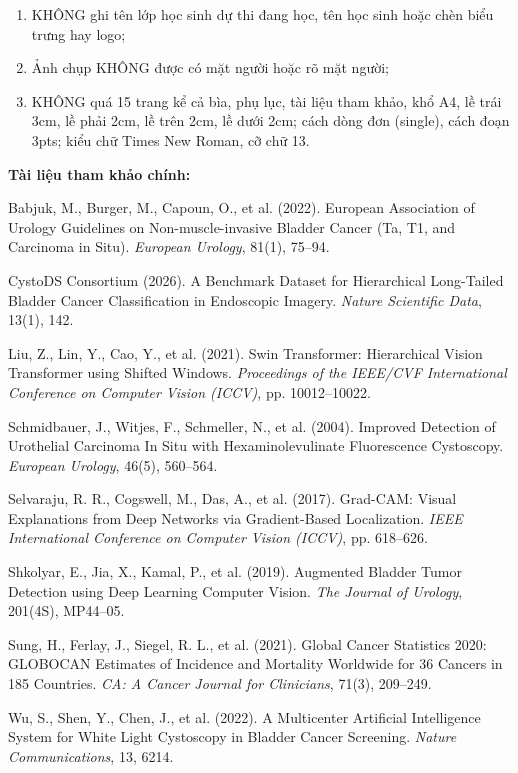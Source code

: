 \documentclass[a4paper]{article}
\begin{document}
\vspace{4pt}

\begin{enumerate}[leftmargin=1.25cm]
  \item KHÔNG ghi tên lớp học sinh dự thi đang học, tên học sinh hoặc chèn biểu trưng hay logo;
  \item Ảnh chụp KHÔNG được có mặt người hoặc rõ mặt người;
  \item KHÔNG quá 15 trang kể cả bìa, phụ lục, tài liệu tham khảo, khổ A4, lề trái 3cm, lề phải 2cm, lề trên 2cm, lề dưới 2cm; cách dòng đơn (single), cách đoạn 3pts; kiểu chữ Times New Roman, cỡ chữ 13.
\end{enumerate}

\vspace{8pt}
\noindent\textbf{Tài liệu tham khảo chính:}
\begin{enumerate}[leftmargin=1.25cm,label={[\arabic*]}]
  \item Babjuk, M., Burger, M., Capoun, O., et al. (2022). European Association of Urology Guidelines on Non-muscle-invasive Bladder Cancer (Ta, T1, and Carcinoma in Situ). \textit{European Urology}, 81(1), 75--94.
  \item CystoDS Consortium (2026). A Benchmark Dataset for Hierarchical Long-Tailed Bladder Cancer Classification in Endoscopic Imagery. \textit{Nature Scientific Data}, 13(1), 142.
  \item Liu, Z., Lin, Y., Cao, Y., et al. (2021). Swin Transformer: Hierarchical Vision Transformer using Shifted Windows. \textit{Proceedings of the IEEE/CVF International Conference on Computer Vision (ICCV)}, pp. 10012--10022.
  \item Schmidbauer, J., Witjes, F., Schmeller, N., et al. (2004). Improved Detection of Urothelial Carcinoma In Situ with Hexaminolevulinate Fluorescence Cystoscopy. \textit{European Urology}, 46(5), 560--564.
  \item Selvaraju, R. R., Cogswell, M., Das, A., et al. (2017). Grad-CAM: Visual Explanations from Deep Networks via Gradient-Based Localization. \textit{IEEE International Conference on Computer Vision (ICCV)}, pp. 618--626.
  \item Shkolyar, E., Jia, X., Kamal, P., et al. (2019). Augmented Bladder Tumor Detection using Deep Learning Computer Vision. \textit{The Journal of Urology}, 201(4S), MP44--05.
  \item Sung, H., Ferlay, J., Siegel, R. L., et al. (2021). Global Cancer Statistics 2020: GLOBOCAN Estimates of Incidence and Mortality Worldwide for 36 Cancers in 185 Countries. \textit{CA: A Cancer Journal for Clinicians}, 71(3), 209--249.
  \item Wu, S., Shen, Y., Chen, J., et al. (2022). A Multicenter Artificial Intelligence System for White Light Cystoscopy in Bladder Cancer Screening. \textit{Nature Communications}, 13, 6214.
\end{enumerate}
\end{document}
